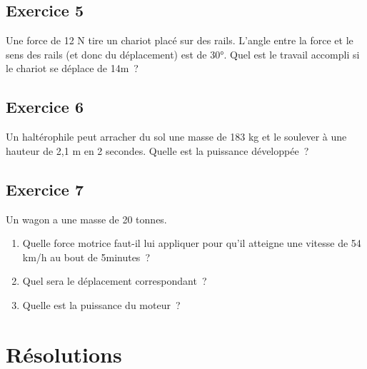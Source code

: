 \begin{multicols}{2}
\subsection*{Exercice 5}

Une force de 12 N tire un chariot placé sur des rails. L'angle entre la
force et le sens des rails (et donc du déplacement) est de 30°. Quel est
le travail accompli si le chariot se déplace de 14m~?

\subsection*{Exercice 6}

Un haltérophile peut arracher du sol une masse de 183 kg et le soulever
à une hauteur de 2,1 m en 2 secondes. Quelle est la puissance
développée~?

\subsection*{Exercice 7}

Un wagon a une masse de 20 tonnes.

\begin{enumerate}
\item   Quelle force motrice faut-il lui appliquer pour qu'il atteigne une
  vitesse de 54 km/h au bout de 5minutes~?
\item   Quel sera le déplacement correspondant~?
\item   Quelle est la puissance du moteur~?
\end{enumerate}

\end{multicols}

\section{Résolutions}

